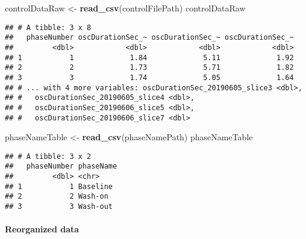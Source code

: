 \documentclass[]{article}
\newenvironment{Shaded}{\begin{snugshade}}{\end{snugshade}}
\newcommand{\KeywordTok}[1]{\textcolor[rgb]{0.13,0.29,0.53}{\textbf{#1}}}
\newcommand{\NormalTok}[1]{#1}
\newcommand{\StringTok}[1]{\textcolor[rgb]{0.31,0.60,0.02}{#1}}
\let\oldparagraph\paragraph
\renewcommand{\paragraph}[1]{\oldparagraph{#1}\mbox{}}
\begin{document}
\begin{Shaded}
\begin{Highlighting}[]
\NormalTok{controlDataRaw <-}\StringTok{ }\KeywordTok{read_csv}\NormalTok{(controlFilePath)}
\NormalTok{controlDataRaw}
\end{Highlighting}
\end{Shaded}

\begin{verbatim}
## # A tibble: 3 x 8
##   phaseNumber oscDurationSec_~ oscDurationSec_~ oscDurationSec_~
##         <dbl>            <dbl>            <dbl>            <dbl>
## 1           1             1.84             5.11             1.92
## 2           2             1.73             5.71             1.82
## 3           3             1.74             5.05             1.64
## # ... with 4 more variables: oscDurationSec_20190605_slice3 <dbl>,
## #   oscDurationSec_20190605_slice4 <dbl>,
## #   oscDurationSec_20190606_slice5 <dbl>,
## #   oscDurationSec_20190606_slice7 <dbl>
\end{verbatim}

\begin{Shaded}
\begin{Highlighting}[]
\NormalTok{phaseNameTable <-}\StringTok{ }\KeywordTok{read_csv}\NormalTok{(phaseNamePath)}
\NormalTok{phaseNameTable}
\end{Highlighting}
\end{Shaded}

\begin{verbatim}
## # A tibble: 3 x 2
##   phaseNumber phaseName
##         <dbl> <chr>    
## 1           1 Baseline 
## 2           2 Wash-on  
## 3           3 Wash-out
\end{verbatim}

\hypertarget{reorganized-data}{%
\paragraph{Reorganized data}\label{reorganized-data}}
\end{document}
